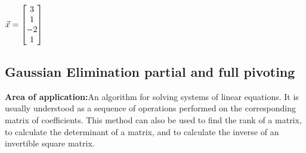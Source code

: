 \documentclass{article}
\begin{document}
$\vec{x} = \begin{bmatrix} 
3\\
1 \\
-2\\
1
\end{bmatrix}\\
$
	\subsection{Gaussian Elimination partial and full pivoting}
{\bf Area of application:}An algorithm for solving systems of linear equations. It is usually understood as a sequence of operations performed on the corresponding matrix of coefficients. This method can also be used to find the rank of a matrix, to calculate the determinant of a matrix, and to calculate the inverse of an invertible square matrix. 
\end{document}

